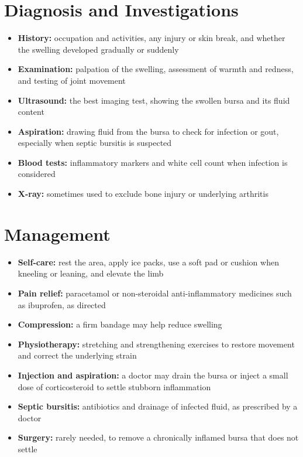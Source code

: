 \section*{Diagnosis and Investigations}
\begin{itemize}
    \item \textbf{History:} occupation and activities, any injury or skin break, and whether the swelling developed gradually or suddenly
    \item \textbf{Examination:} palpation of the swelling, assessment of warmth and redness, and testing of joint movement
    \item \textbf{Ultrasound:} the best imaging test, showing the swollen bursa and its fluid content
    \item \textbf{Aspiration:} drawing fluid from the bursa to check for infection or gout, especially when septic bursitis is suspected
    \item \textbf{Blood tests:} inflammatory markers and white cell count when infection is considered
    \item \textbf{X-ray:} sometimes used to exclude bone injury or underlying arthritis
\end{itemize}

\section*{Management}
\begin{itemize}
    \item \textbf{Self-care:} rest the area, apply ice packs, use a soft pad or cushion when kneeling or leaning, and elevate the limb
    \item \textbf{Pain relief:} paracetamol or non-steroidal anti-inflammatory medicines such as ibuprofen, as directed
    \item \textbf{Compression:} a firm bandage may help reduce swelling
    \item \textbf{Physiotherapy:} stretching and strengthening exercises to restore movement and correct the underlying strain
    \item \textbf{Injection and aspiration:} a doctor may drain the bursa or inject a small dose of corticosteroid to settle stubborn inflammation
    \item \textbf{Septic bursitis:} antibiotics and drainage of infected fluid, as prescribed by a doctor
    \item \textbf{Surgery:} rarely needed, to remove a chronically inflamed bursa that does not settle
\end{itemize}

